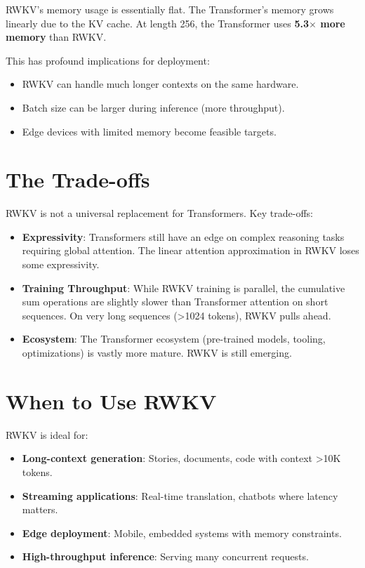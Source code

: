 \documentclass[12pt]{article}
\begin{document}
RWKV's memory usage is essentially flat. The Transformer's memory grows linearly due to the KV cache. At length 256, the Transformer uses \textbf{5.3$\times$ more memory} than RWKV.

This has profound implications for deployment:
\begin{itemize}
    \item RWKV can handle much longer contexts on the same hardware.
    \item Batch size can be larger during inference (more throughput).
    \item Edge devices with limited memory become feasible targets.
\end{itemize}

\section*{The Trade-offs}

RWKV is not a universal replacement for Transformers. Key trade-offs:

\begin{itemize}
    \item \textbf{Expressivity}: Transformers still have an edge on complex reasoning tasks requiring global attention. The linear attention approximation in RWKV loses some expressivity.
    
    \item \textbf{Training Throughput}: While RWKV training is parallel, the cumulative sum operations are slightly slower than Transformer attention on short sequences. On very long sequences (>1024 tokens), RWKV pulls ahead.
    
    \item \textbf{Ecosystem}: The Transformer ecosystem (pre-trained models, tooling, optimizations) is vastly more mature. RWKV is still emerging.
\end{itemize}

\section*{When to Use RWKV}

RWKV is ideal for:
\begin{itemize}
    \item \textbf{Long-context generation}: Stories, documents, code with context >10K tokens.
    \item \textbf{Streaming applications}: Real-time translation, chatbots where latency matters.
    \item \textbf{Edge deployment}: Mobile, embedded systems with memory constraints.
    \item \textbf{High-throughput inference}: Serving many concurrent requests.
\end{itemize}
\end{document}
